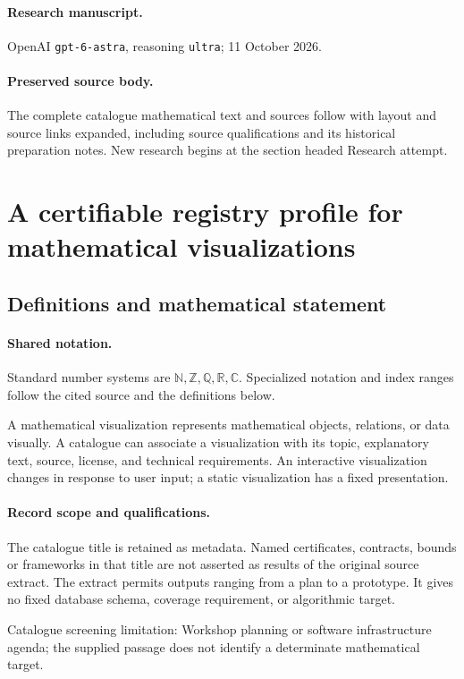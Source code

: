 \documentclass[11pt]{article}
\begin{document}
\paragraph{Research manuscript.} OpenAI \texttt{gpt-6-astra}, reasoning \texttt{ultra}; 11 October 2026.
\paragraph{Preserved source body.} The complete catalogue mathematical text and sources follow with layout and source links expanded, including source qualifications and its historical preparation notes. New research begins at the section headed Research attempt.

\section{A certifiable registry profile for mathematical visualizations}\label{statement}

\subsection{Definitions and mathematical statement}

\paragraph{Shared notation.}Standard number systems are $\mathbb N,\mathbb Z,\mathbb Q,\mathbb R,\mathbb C$. Specialized notation and index ranges follow the cited source and the definitions below.


A mathematical visualization represents mathematical objects, relations, or data visually. A catalogue can associate a visualization with its topic, explanatory text, source, license, and technical requirements. An interactive visualization changes in response to user input; a static visualization has a fixed presentation.
\paragraph{Record scope and qualifications.}
The catalogue title is retained as metadata. Named certificates, contracts, bounds or frameworks in that title are not asserted as results of the original source extract.
The extract permits outputs ranging from a plan to a prototype. It gives no fixed database schema, coverage requirement, or algorithmic target.

Catalogue screening limitation: Workshop planning or software infrastructure agenda; the supplied passage does not identify a determinate mathematical target.
\end{document}
